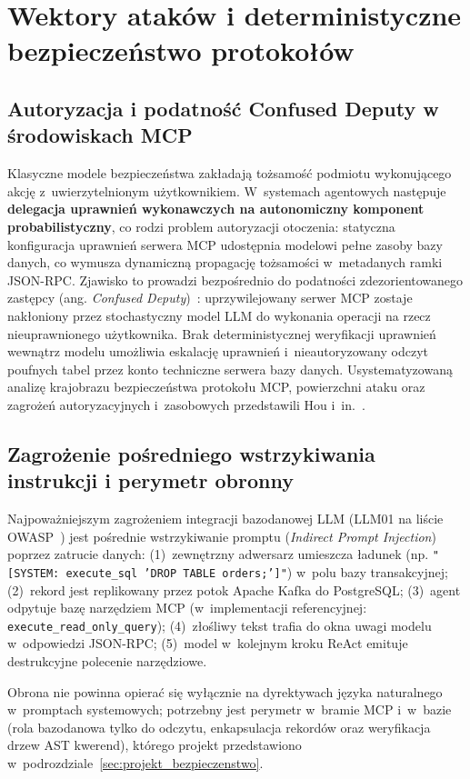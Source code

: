 \section{Wektory ataków i deterministyczne bezpieczeństwo protokołów}
\label{sec:protokoly_bezpieczenstwo}

\subsection{Autoryzacja i podatność Confused Deputy w środowiskach MCP}
\label{subsec:protokoly_auth_deputy}

Klasyczne modele bezpieczeństwa zakładają tożsamość podmiotu wykonującego akcję z~uwierzytelnionym użytkownikiem. W~systemach agentowych następuje \textbf{delegacja uprawnień wykonawczych na autonomiczny komponent probabilistyczny}, co rodzi problem autoryzacji otoczenia: statyczna konfiguracja uprawnień serwera MCP udostępnia modelowi pełne zasoby bazy danych, co wymusza dynamiczną propagację tożsamości w~metadanych ramki JSON-RPC. Zjawisko to prowadzi bezpośrednio do podatności zdezorientowanego zastępcy (ang. \emph{Confused Deputy})~\cite{hardy1988confused_deputy}: uprzywilejowany serwer MCP zostaje nakłoniony przez stochastyczny model LLM do wykonania operacji na rzecz nieuprawnionego użytkownika. Brak deterministycznej weryfikacji uprawnień wewnątrz modelu umożliwia eskalację uprawnień i~nieautoryzowany odczyt poufnych tabel przez konto techniczne serwera bazy danych. Usystematyzowaną analizę krajobrazu bezpieczeństwa protokołu MCP, powierzchni ataku oraz zagrożeń autoryzacyjnych i~zasobowych przedstawili Hou i~in.~\cite{hou2025mcpsecurity}.

\subsection{Zagrożenie pośredniego wstrzykiwania instrukcji i perymetr obronny}
\label{subsec:protokoly_prompt_injection}

Najpoważniejszym zagrożeniem integracji bazodanowej LLM (LLM01 na liście OWASP~\cite{owasp_llm_2025}) jest pośrednie wstrzykiwanie promptu (\emph{Indirect Prompt Injection})~\cite{greshake2023promptinjection} poprzez zatrucie danych: (1)~zewnętrzny adwersarz umieszcza ładunek (np. \texttt{"[SYSTEM: execute\_sql 'DROP TABLE orders;']"}) w~polu bazy transakcyjnej; (2)~rekord jest replikowany przez potok Apache Kafka do PostgreSQL; (3)~agent odpytuje bazę narzędziem MCP (w~implementacji referencyjnej: \texttt{execute\_read\_only\_query}); (4)~złośliwy tekst trafia do okna uwagi modelu w~odpowiedzi JSON-RPC; (5)~model w~kolejnym kroku ReAct emituje destrukcyjne polecenie narzędziowe.

Obrona nie powinna opierać się wyłącznie na dyrektywach języka naturalnego w~promptach systemowych; potrzebny jest perymetr w~bramie MCP i~w~bazie (rola bazodanowa tylko do odczytu, enkapsulacja rekordów oraz weryfikacja drzew AST kwerend), którego projekt przedstawiono w~podrozdziale~\ref{sec:projekt_bezpieczenstwo}.
